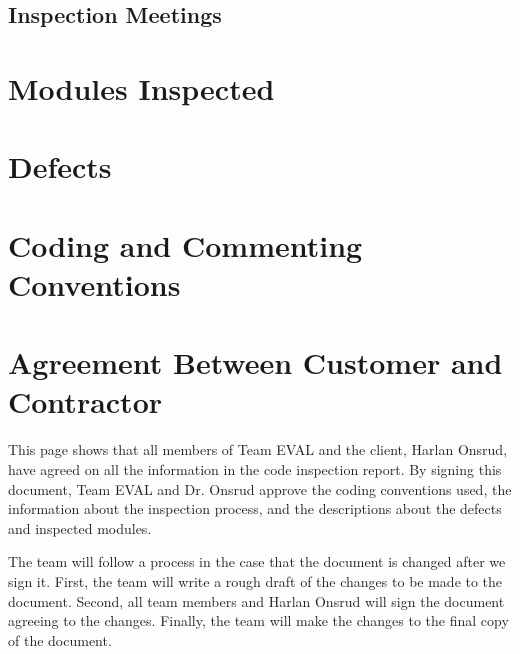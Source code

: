 \documentclass{article}
\begin{document}
\subsection{Inspection Meetings}



\section{Modules Inspected}



\section{Defects}



\begin{center}
\end{center}

\appendix

\newpage
\section{Coding and Commenting Conventions}



\newpage
\section{Agreement Between Customer and Contractor}
This page shows that all members of Team EVAL and the client, Harlan Onsrud, have agreed on all the information in the code inspection report. By signing this document, Team EVAL and Dr. Onsrud approve the coding conventions used, the information about the inspection process, and the descriptions about the defects and inspected modules.

The team will follow a process in the case that the document is changed after we sign it. First, the team will write a rough draft of the changes to be made to the document. Second, all team members and Harlan Onsrud will sign the document agreeing to the changes. Finally, the team will make the changes to the final copy of the document.
\end{document}
